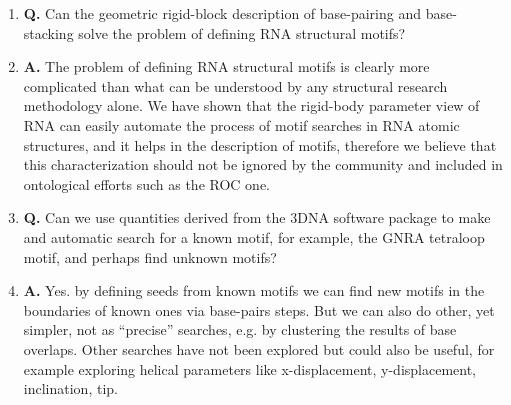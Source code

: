 \documentclass[10pt, oneside, pdftex]{article}
\begin{document}
\begin{enumerate}
\item{\textbf{Q.}  Can   the  geometric  rigid-block   description  of
  base-pairing  and base-stacking  solve the  problem of  defining RNA
  structural motifs?}
\item{\textbf{A.}  The problem  of defining  RNA structural  motifs is
  clearly  more  complicated  than  what  can  be  understood  by  any
  structural  research  methodology  alone.  We have  shown  that  the
  rigid-body parameter view of RNA  can easily automate the process of
  motif  searches  in RNA  atomic  structures,  and  it helps  in  the
  description   of   motifs,    therefore   we   believe   that   this
  characterization should not be ignored by the community and included
  in ontological efforts such as the ROC one.}
\item{\textbf{Q.} Can we use quantities derived from the 3DNA software
  package to make and automatic search for a known motif, for example,
  the GNRA tetraloop motif, and perhaps find unknown motifs?}
\item{\textbf{A.} Yes. by defining seeds from known motifs we can find
new motifs in  the boundaries of known ones  via base-pairs steps. But
we  can also  do  other,  yet simpler,  not  as ``precise''  searches,
e.g. by clustering  the results of base overlaps.  Other searches have
not  been explored  but could  also be  useful, for  example exploring
helical  parameters like x-displacement,  y-displacement, inclination,
tip.} 
\end{enumerate}



	
\end{document}
